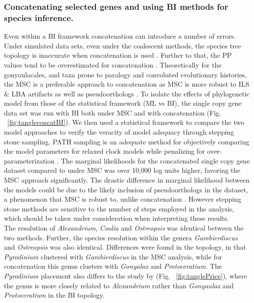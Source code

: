 \documentclass[fleqn,10pt,lineno]{wlpeerj} %
\begin{document}
\subsubsection*{Concatenating selected genes and using BI methods for species inference.}
Even within a BI framework concatenation can introduce a number of errors. 
Under simulated data sets, even under the coalescent methods, the species tree topology is inaccurate when concatenation is used \citep{kubatko2007inconsistency}. 
Further to that, the PP values tend to be overestimated for concatenation \citep{suzuki2002overcredibility}. 
Theoretically for the gonyaulacales, and taxa prone to paralogy and convoluted evolutionary histories, the MSC is a preferable approach to concatenation as MSC is more robust to ILS \& LBA artifacts as well as pseudoorthologs \citep{liu2014coalescent,du2019species}. 
To isolate the effects of phylogenetic model from those of the statistical framework (ML vs BI), the single copy gene data set was run with BI both under MSC and with concatenation (Fig. ~\ref{fig:tangleconcatBI}). 
We then used a statistical framework to compare the two model approaches to verify the veracity of model adequacy through stepping stone sampling. 
PATH sampling is an adequate method for objectively comparing the model parameters for relaxed clock models while penalizing for over-parameterization \citep{baele2012accurate}. 
The marginal likelihoods for the concatenated single copy gene dataset compared to under MSC was over 10,000 log units higher, favoring the MSC approach significantly. 
The drastic difference in marginal likelihood between the models could be due to the likely inclusion of pseudoorthologs in the dataset, a phenomenon that MSC is robust to, unlike concatenation \citep{du2019species,roch2015likelihood}.
However stepping stone methods are sensitive to the number of steps employed in the analysis, which should be taken under consideration when interpreting these results. \\
The resolution of \textit{Alexandrium}, \textit{Coolia} and \textit{Ostreopsis} was identical between the two methods. 
Further, the species resolution within the genera \textit{Gambierdiscus} and \textit{Ostreopsis} was also identical. 
Differences were found in the topology, in that \textit{Pyrodinium} clustered with \textit{Gambierdiscus} in the MSC analysis, while for concatenation this genus clusters with \textit{Gonyalax} and \textit{Protoceratium}. 
The \textit{Pyrodinium} placement also differs to the study by \cite{price2017robust} (Fig. ~\ref{fig:tanglePrice}), where the genus is more closely related to \textit{Alexandrium} rather than \textit{Gonyaulax} and \textit{Protoceratium} in the BI topology. 
\end{document}
